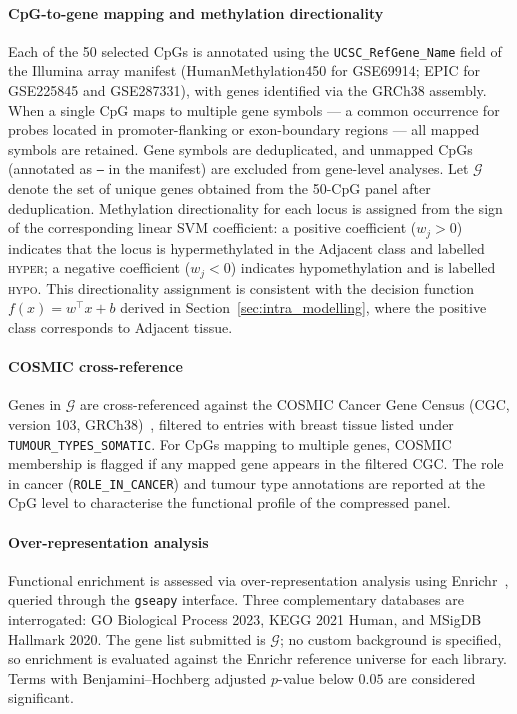 \paragraph{CpG-to-gene mapping and methylation directionality}

Each of the 50 selected CpGs is annotated using the
\texttt{UCSC\_RefGene\_Name} field of the Illumina array
manifest (HumanMethylation450 for GSE69914; EPIC for
GSE225845 and GSE287331), with genes identified via the
GRCh38 assembly. When a single CpG maps to multiple gene
symbols — a common occurrence for probes located in
promoter-flanking or exon-boundary regions — all mapped
symbols are retained. Gene symbols are deduplicated, and
unmapped CpGs (annotated as \texttt{--} in the manifest)
are excluded from gene-level analyses.
Let $\mathcal{G}$ denote the set of unique genes obtained
from the 50-CpG panel after deduplication. Methylation
directionality for each locus is assigned from the sign of
the corresponding linear SVM coefficient: a positive
coefficient ($w_j > 0$) indicates that the locus is
hypermethylated in the Adjacent class and labelled
\textsc{hyper}; a negative coefficient ($w_j < 0$)
indicates hypomethylation and is labelled \textsc{hypo}.
This directionality assignment is consistent with the
decision function $f(x) = w^\top x + b$ derived in
Section~\ref{sec:intra_modelling}, where the positive class
corresponds to Adjacent tissue.

\paragraph{COSMIC cross-reference}

Genes in $\mathcal{G}$ are cross-referenced against the
COSMIC Cancer Gene Census (CGC, version 103,
GRCh38)~\cite{sondka2018cosmic}, filtered to entries with
breast tissue listed under \texttt{TUMOUR\_TYPES\_SOMATIC}.
For CpGs mapping to multiple genes, COSMIC membership is
flagged if any mapped gene appears in the filtered CGC.
The role in cancer (\texttt{ROLE\_IN\_CANCER}) and tumour
type annotations are reported at the CpG level to
characterise the functional profile of the compressed panel.

\paragraph{Over-representation analysis}

Functional enrichment is assessed via over-representation
analysis using Enrichr~\cite{kuleshov2016enrichr},
queried through the \texttt{gseapy} interface. Three
complementary databases are interrogated: GO Biological
Process 2023, KEGG 2021 Human, and MSigDB Hallmark 2020.
The gene list submitted is $\mathcal{G}$; no custom
background is specified, so enrichment is evaluated against
the Enrichr reference universe for each library. Terms with
Benjamini--Hochberg adjusted $p$-value below $0.05$ are
considered significant.



